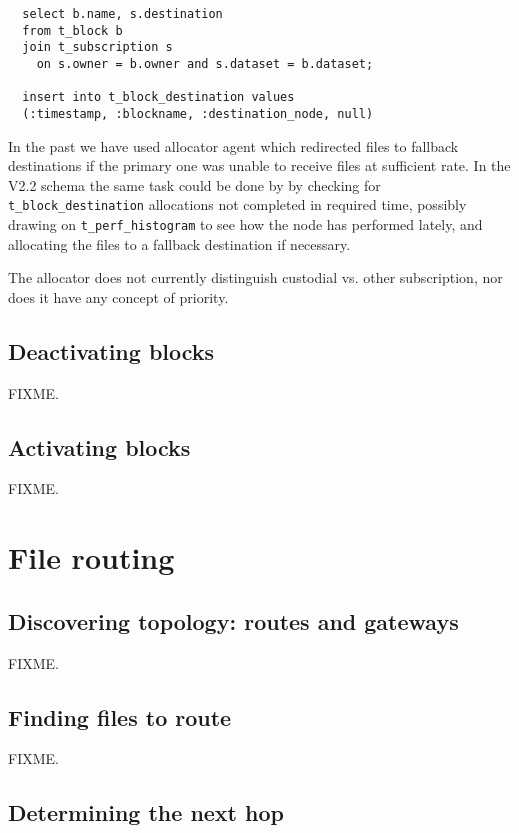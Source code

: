 \documentclass{cmspaper}
\begin{document}
{\small\begin{verbatim}
  select b.name, s.destination
  from t_block b
  join t_subscription s
    on s.owner = b.owner and s.dataset = b.dataset;

  insert into t_block_destination values
  (:timestamp, :blockname, :destination_node, null)
\end{verbatim}}

In the past we have used allocator agent which redirected files to fallback destinations if the primary one was unable to receive files at sufficient rate.  In the V2.2 schema the same task could be done by by checking for \texttt{t\_block\_destination} allocations not completed in required time, possibly drawing on \texttt{t\_perf\_histogram} to see how the node has performed lately, and allocating the files to a fallback destination if necessary.

The allocator does not currently distinguish custodial vs. other subscription, nor does it have any concept of priority.

\subsection{Deactivating blocks}

FIXME.

\subsection{Activating blocks}

FIXME.

\section{File routing}

\subsection{Discovering topology: routes and gateways}

FIXME.

\subsection{Finding files to route}

FIXME.

\subsection{Determining the next hop}
\end{document}
